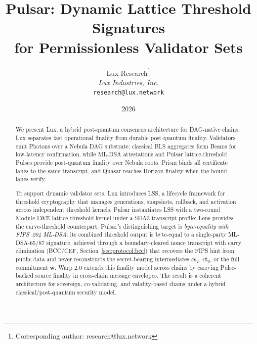 \documentclass[11pt,a4paper]{article}
\title{Pulsar: Dynamic Lattice Threshold Signatures\\for Permissionless Validator Sets}
\author{
Lux Research\thanks{Corresponding author: research@lux.network}\\
\textit{Lux Industries, Inc.}\\
\texttt{research@lux.network}
}
\date{2026}
\begin{document}
\luxcoverpage

\begin{abstract}
We present Lux, a hybrid post-quantum consensus architecture for DAG-native chains. Lux separates fast operational finality from durable post-quantum finality. Validators emit Photons over a Nebula DAG substrate; classical BLS aggregates form Beams for low-latency confirmation, while ML-DSA attestations and Pulsar lattice-threshold Pulses provide post-quantum finality over Nebula roots. Prism binds all certificate lanes to the same transcript, and Quasar reaches Horizon finality when the bound lanes verify.

To support dynamic validator sets, Lux introduces LSS, a lifecycle framework for threshold cryptography that manages generations, snapshots, rollback, and activation across independent threshold kernels. Pulsar instantiates LSS with a two-round Module-LWE lattice threshold kernel under a SHA3 transcript profile; Lens provides the curve-threshold counterpart. Pulsar's distinguishing target is \emph{byte-equality with FIPS~204 ML-DSA}: its combined threshold output is byte-equal to a single-party ML-DSA-65/87 signature, achieved through a boundary-cleared nonce transcript with carry elimination (BCC/CEF, Section~\ref{sec:protocol:bcc}) that recovers the FIPS hint from public data and never reconstructs the secret-bearing intermediates $c\mathbf{s}_2$, $c\mathbf{t}_0$, or the full commitment $\mathbf{w}$. Warp 2.0 extends this finality model across chains by carrying Pulse-backed source finality in cross-chain message envelopes. The result is a coherent architecture for sovereign, co-validating, and validity-based chains under a hybrid classical/post-quantum security model.


\end{abstract}
\end{document}
